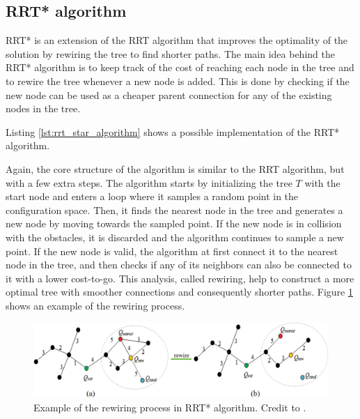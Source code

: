 \subsection{RRT* algorithm}
\label{subsec:rrt_star_algorithm}

RRT* is an extension of the RRT algorithm that improves the optimality of the solution by rewiring the tree to find shorter paths.
The main idea behind the RRT* algorithm is to keep track of the cost of reaching each node in the tree and to rewire the tree whenever a new node is added.
This is done by checking if the new node can be used as a cheaper parent connection for any of the existing nodes in the tree.

Listing \ref{lst:rrt_star_algorithm} shows a possible implementation of the RRT* algorithm.




Again, the core structure of the algorithm is similar to the RRT algorithm, but with a few extra steps.
The algorithm starts by initializing the tree $T$ with the start node and enters a loop where it samples a random point in the configuration space.
Then, it finds the nearest node in the tree and generates a new node by moving towards the sampled point.
If the new node is in collision with the obstacles, it is discarded and the algorithm continues to sample a new point.
If the new node is valid, the algorithm at first connect it to the nearest node in the tree, and then checks if any of its neighbors can also be connected to it with a lower cost-to-go.
This analysis, called rewiring, help to construct a more optimal tree with smoother connections and consequently shorter paths.
Figure \ref{fig:rrt_star} shows an example of the rewiring process.

\begin{figure}[H]
    \centering
    \includegraphics[width=1.0\textwidth]{./img/rrt_star.png}
    \caption{Example of the rewiring process in RRT* algorithm. Credit to \cite{JIANG20244303}.}
    \label{fig:rrt_star}
\end{figure}

